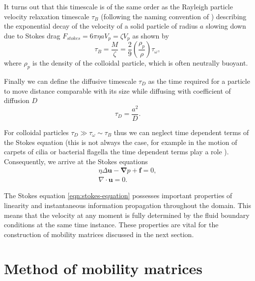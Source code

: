 \documentclass{doctoral}
\begin{document}
It turns out that this timescale is of the same order as the Rayleigh particle velocity relaxation timescale $\tau_B$ (following the naming convention of \textcite{vanKampen_2011}) describing the exponential decay of the velocity of a solid particle of radius $a$ slowing down due to Stokes drag $F_{stokes} = 6 \pi \eta a V_p = \zeta V_p$ as shown by
\begin{equation}
    \tau_B = \frac{M}{\zeta} = \frac{2}{9} \left( \frac{\rho_p}{\rho} \right) \tau_\omega, \label{eqn:raighley-timescale}
\end{equation}
where $\rho_p$ is the density of the colloidal particle, which is often neutrally buoyant.

Finally we can define the diffusive timescale $\tau_D$ as the time required for a particle to move distance comparable with its size while diffusing with coefficient of diffusion $D$
\begin{equation}
    \tau_D = \frac{a^2}{D}.
    \label{eqn:diffusive-timescale}
\end{equation}

For colloidal particles $\tau_D \gg \tau_\omega \sim \tau_B$ thus we can neglect time dependent terms of the Stokes equation (this is not always the case, for example in the motion of carpets of cilia or bacterial flagella the time dependent terms play a role \cite{Wei_2021}).
Consequently, we arrive at the Stokes equations
\begin{eqnarray}
    \eta \Delta \bm{u} - \bm{\nabla} p + \bm{f} = 0, \label{eqn:stokes-equation} \\
    \nabla \cdot \bm{u} = 0.
\end{eqnarray}

The Stokes equation \eqref{eqn:stokes-equation} possesses important properties of linearity and instantaneous information propagation throughout the domain.
This means that the velocity at any moment is fully determined by the fluid boundary conditions at the same time instance.
These properties are vital for the construction of mobility matrices discussed in the next section.

\section{Method of mobility matrices}
\end{document}
